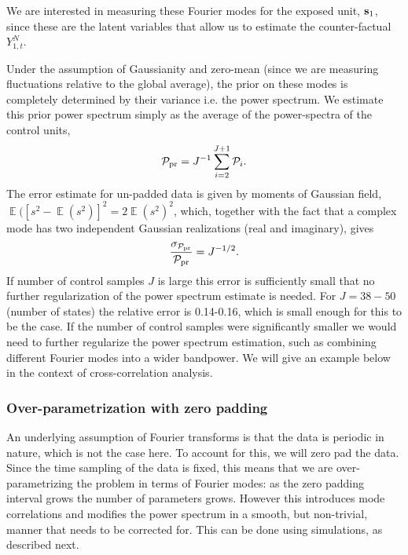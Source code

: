 \documentclass{article}
\DeclareMathOperator{\E}{\mathbb{E}}
\def\bs{{\bf s}}
\def\pprior{\mathcal{P_{\rm pr}}}
\newcommand\CM[1]{\textcolor{blue}{(CM: #1)}}
\begin{document}
We are interested in measuring these Fourier modes for the exposed unit, $\bs_1$, since these are the latent variables that allow us to estimate the counter-factual $Y^N_{1,t}$.

Under the assumption of Gaussianity and zero-mean (since we are measuring fluctuations relative to the global average),
the prior on these modes is completely determined by their variance i.e. the power spectrum. We estimate this prior power spectrum simply as the average of the power-spectra of the control units,
\begin{equation}
    \pprior = J^{-1}\sum_{i=2}^{J+1} \mathcal{P}_{i} . 
\end{equation}
The error estimate for un-padded data is given by 
moments of Gaussian field, $\E([s^2-\E(s^2)]^2=2\E(s^2)^2$, which, together with the fact that a complex mode has two 
independent Gaussian realizations (real and imaginary), gives
\begin{equation}
\frac{\sigma_{\pprior}}{\pprior}=J^{-1/2}. 
\label{err}
\end{equation}{}
If number of control samples $J$ is large this error is sufficiently small that no further regularization 
of the power spectrum estimate is needed. 
For $J=38-50$ (number of states) the relative error is 0.14-0.16, 
which is small enough for this to be the case. 
If the number of control samples
were significantly smaller we would need to further regularize the power spectrum estimation, such as combining different Fourier modes
into a wider bandpower. 
We will give an example below in the context of cross-correlation analysis. 

\subsubsection{Over-parametrization with zero padding}
\label{sec:zeropadding}
An underlying assumption of Fourier transforms is that the data is periodic in nature, which is not the case here. To account for this, we will zero pad the data. Since the time sampling of the data is 
fixed, 
this means that we are over-parametrizing the 
problem in terms of Fourier modes: as the zero 
padding interval grows the number of parameters grows. 
However this introduces mode correlations and modifies the power spectrum in a smooth, but non-trivial, manner that needs to be corrected for. This can be done using simulations, as described next. 
\end{document}
